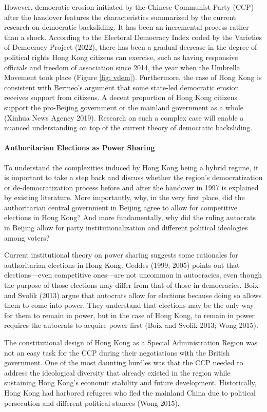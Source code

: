 \documentclass[letterpaper, 12pt]{article}
\begin{document}
However, democratic erosion initiated by the Chinese Communist Party (CCP) after the handover features the characteristics summarized by the current research on democratic backsliding. It has been an incremental process rather than a shock. According to the Electoral Democracy Index coded by the Varieties of Democracy Project (2022), there has been a gradual decrease in the degree of political rights Hong Kong citizens can exercise, such as having responsive officials and freedom of association since 2014, the year when the Umbrella Movement took place (Figure \ref{fig: vdem}). Furthermore, the case of Hong Kong is consistent with Bermeo's argument that some state-led democratic erosion receives support from citizens. A decent proportion of Hong Kong citizens support the pro-Beijing government or the mainland government as a whole (Xinhua News Agency 2019). Research on such a complex case will enable a nuanced understanding on top of the current theory of democratic backsliding.



\paragraph{Authoritarian Elections as Power Sharing} 
To understand the complexities induced by Hong Kong being a hybrid regime, it is important to take a step back and discuss whether the region's democratization or de-democratization process before and after the handover in 1997 is explained by existing literature. More importantly, why, in the very first place, did the authoritarian central government in Beijing agree to allow for competitive elections in Hong Kong? And more fundamentally, why did the ruling autocrats in Beijing allow for party institutionalization and different political ideologies among voters?

Current institutional theory on power sharing suggests some rationales for authoritarian elections in Hong Kong. Geddes (1999; 2005) points out that elections---even competitive ones---are not uncommon in autocracies, even though the purpose of those elections may differ from that of those in democracies. Boix and Svolik (2013) argue that autocrats allow for elections because doing so allows them to come into power. They understand that elections may be the only way for them to remain in power, but in the case of Hong Kong, to remain in power requires the autocrats to acquire power first (Boix and Svolik 2013; Wong 2015). 

The constitutional design of Hong Kong as a Special Administration Region was not an easy task for the CCP during their negotiations with the British government. One of the most daunting hurdles was that the CCP needed to address the ideological diversity that already existed in the region while sustaining Hong Kong's economic stability and future development. Historically, Hong Kong had harbored refugees who fled the mainland China due to political persecution and different political stances (Wong 2015). 
\end{document}
